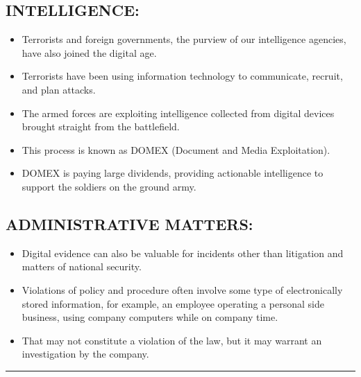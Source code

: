 \documentclass[10pt,british,english]{article}
\begin{document}
\subsection{INTELLIGENCE:}
\begin{itemize}
\item Terrorists and foreign governments, the purview of our intelligence
agencies, have also joined the digital age. 
\item Terrorists have been using information technology to communicate,
recruit, and plan attacks. 
\item The armed forces are exploiting intelligence collected from digital
devices brought straight from the battlefield. 
\item This process is known as DOMEX (Document and Media Exploitation). 
\item DOMEX is paying large dividends, providing actionable intelligence
to support the soldiers on the ground army.
\end{itemize}

\subsection{ADMINISTRATIVE MATTERS:}
\begin{itemize}
\item Digital evidence can also be valuable for incidents other than litigation
and matters of national security. 
\item Violations of policy and procedure often involve some type of electronically
stored information, for example, an employee operating a personal
side business, using company computers while on company time. 
\item That may not constitute a violation of the law, but it may warrant
an investigation by the company.
\end{itemize}
\rule[0.5ex]{1\columnwidth}{1pt}
\end{document}
